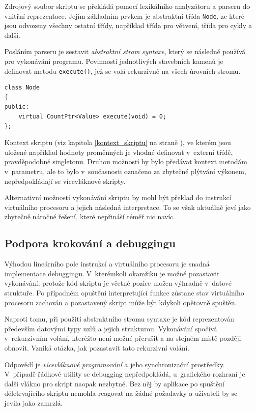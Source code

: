 \documentclass[11pt,twoside,a4paper]{book}
\begin{document}
Zdrojový soubor skriptu se překládá pomocí lexikálního analyzátoru a parseru do vnitřní reprezentace. Jejím základním prvkem je abstraktní třída \texttt{Node}, ze které jsou odvozeny všechny ostatní třídy, například třída pro větvení, třída pro cykly a další.

Posláním parseru je sestavit \textit{abstraktní strom syntaxe}, který se následně používá pro vykonávání programu. Povinností jednotlivých stavebních kamenů je definovat metodu \texttt{e\-xe\-cu\-te()}, jež se volá rekurzivně na všech úrovních stromu.

\begin{verbatim}
class Node
{
public:
    virtual CountPtr<Value> execute(void) = 0;
};
\end{verbatim}

Kontext skriptu (viz kapitola \ref{kontext_skriptu} na straně \pageref{kontext_skriptu}), ve kterém jsou uložené například hodnoty proměnných je vhodné definovat v~externí třídě, pravděpodobně singletonu. Druhou možností by bylo předávat kontext metodám v~parametru, ale to bylo v~současnosti označeno za zbytečné plýtvání výkonem, nepředpokládají se vícevláknové skripty.

Alternativní možností vykonávání skriptu by mohl být překlad do instrukcí virtuálního procesoru a jejich následná interpretace. To se však aktuálně jeví jako zbytečně náročné řešení, které nepřináší téměř nic navíc.


\subsection{Podpora krokování a debuggingu}
\label{podpora_debuggingu}

Výhodou lineárního pole instrukcí a virtuálního procesoru je snadná implementace de\-bug\-gin\-gu. V~kterémkoli okamžiku je možné pozastavit vykonávání, protože kód skriptu je včetně pozice uložen výhradně v~datové struktuře. Po případném opuštění interpretující funkce zůstane stav vir\-tu\-ál\-ní\-ho procesoru zachován a pozastavený skript může být kdykoli opětovně spuštěn.

Naproti tomu, při použití abstraktního stromu syntaxe je kód reprezentován především datovými typy uzlů a jejich strukturou. Vykonávání spočívá v~rekurzivním volání, kteréžto není možné přerušit a na stejném místě později obnovit. Vzniká otázka, jak pozastavit tato rekurzivní volání.

Odpovědí je \textit{vícevláknové programování} a jeho synchronizační prostředky. V~případě řádkové utility se debugging nepředpokládá, u~grafického rozhraní je další vlákno pro skript naopak nezbytné. Bez něj by aplikace po spuštění déletrvajícího skriptu nemohla reagovat na žádné požadavky a uživateli by se jevila jako zamrzlá.
\end{document}

